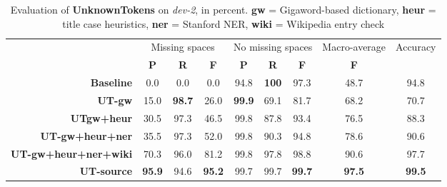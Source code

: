 \documentclass[a4paper,10pt]{scrartcl}
\theoremstyle{style}
\begin{document}
\begin{table}
\begin{center}
\begin{tabular}{|r|c|c|c|c|c|c|c|c|}
\hline
& \multicolumn{3}{c|}{Missing spaces} & \multicolumn{3}{c|}{No missing spaces} & Macro-average & Accuracy\\
& \textbf{P} & \textbf{R} & \textbf{F} & \textbf{P} & \textbf{R} & \textbf{F} & \textbf{F} & \\
\hline
\textbf{Baseline} & 0.0 & 0.0 & 0.0 & 94.8 & \textbf{100} & 97.3 & 48.7 & 94.8\\
\hline
\textbf{UT-gw} & 15.0 & \textbf{98.7} & 26.0 & \textbf{99.9} & 69.1 & 81.7 & 68.2 & 70.7\\
\hline
\textbf{UTgw+heur} & 30.5 & 97.3 & 46.5 & 99.8 & 87.8 & 93.4 & 76.5 & 88.3\\
\hline
\textbf{UT-gw+heur+ner} & 35.5 & 97.3 & 52.0 & 99.8 & 90.3 & 94.8 & 78.6 & 90.6\\
\hline
\textbf{UT-gw+heur+ner+wiki} & 70.3 & 96.0 & 81.2 & 99.8 & 97.8 & 98.8 & 90.6 & 97.7\\
\hline
\textbf{UT-source} & \textbf{95.9} & 94.6 & \textbf{95.2} & 99.7 & 99.7 & \textbf{99.7} & \textbf{97.5} & \textbf{99.5}\\
\hline
\end{tabular}
\end{center}
\caption{Evaluation of \textbf{UnknownTokens} on \textit{dev-2}, in percent. \textbf{gw} = Gigaword-based dictionary, \textbf{heur} = title case heuristics, \textbf{ner} = Stanford NER, \textbf{wiki} = Wikipedia entry check}
\label{eval_unknowntokens}
\end{table}
\end{document}
